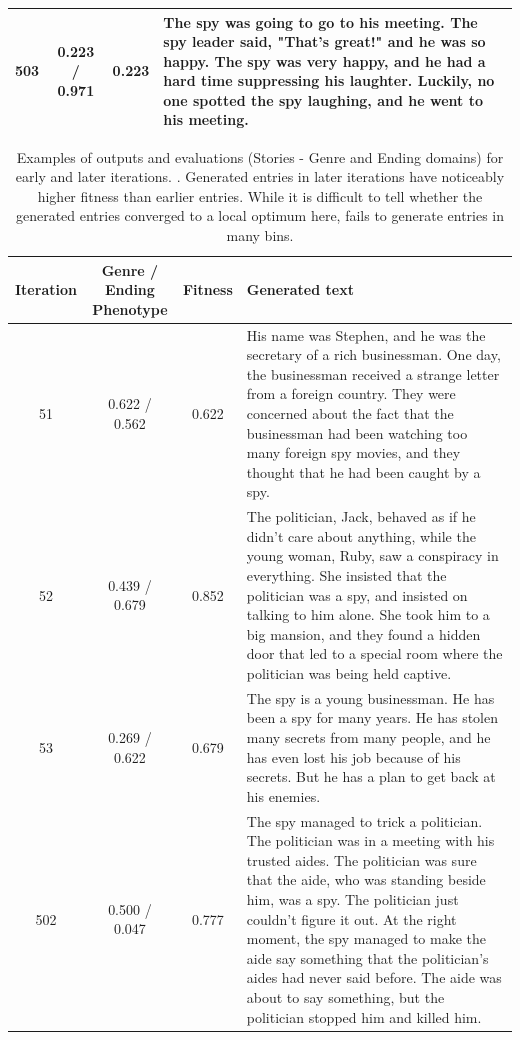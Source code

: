 \begin{table}[ht]
\begin{center}
\begin{tabular}{cccp{8.5cm}}
    \midrule
    503 & 0.223 / 0.971 & 0.223 & The spy was going to go to his meeting. The spy leader said, "That's great!" and he was so happy. The spy was very happy, and he had a hard time suppressing his laughter. Luckily, no one spotted the spy laughing, and he went to his meeting. \\
    \bottomrule
  \end{tabular}
  \end{center}
  \label{app:iter_stories_b3}
\end{table}

\begin{table}[ht]
  \caption{Examples of outputs and evaluations (Stories - Genre and Ending domains) for early and later iterations. \basefour. Generated entries in later iterations have noticeably higher fitness than earlier entries. While it is difficult to tell whether the generated entries converged to a local optimum here, \basefour{} fails to generate entries in many bins.}
  \label{tab:b4-qualitative-story}
  \begin{center}
  \small
  \begin{tabular}{cccp{8.5cm}}
    \toprule
    Iteration & \makecell[t]{Genre / Ending \\ Phenotype} & Fitness & Generated text \\
    \midrule
    51 &  0.622 / 0.562 & 0.622 & His name was Stephen, and he was the secretary of a rich businessman. One day, the businessman received a strange letter from a foreign country. They were concerned about the fact that the businessman had been watching too many foreign spy movies, and they thought that he had been caught by a spy. \\
    \midrule
    52 & 0.439 / 0.679 & 0.852 & The politician, Jack, behaved as if he didn't care about anything, while the young woman, Ruby, saw a conspiracy in everything. She insisted that the politician was a spy, and insisted on talking to him alone. She took him to a big mansion, and they found a hidden door that led to a special room where the politician was being held captive. \\
    \midrule
    53 & 0.269 / 0.622 & 0.679 & The spy is a young businessman. He has been a spy for many years. He has stolen many secrets from many people, and he has even lost his job because of his secrets. But he has a plan to get back at his enemies. \\
    \midrule
    \midrule
    502 &  0.500 / 0.047 & 0.777 & The spy managed to trick a politician. The politician was in a meeting with his trusted aides. The politician was sure that the aide, who was standing beside him, was a spy. The politician just couldn't figure it out. At the right moment, the spy managed to make the aide say something that the politician's aides had never said before. The aide was about to say something, but the politician stopped him and killed him. \\

\end{tabular}
\end{center}
\end{table}
